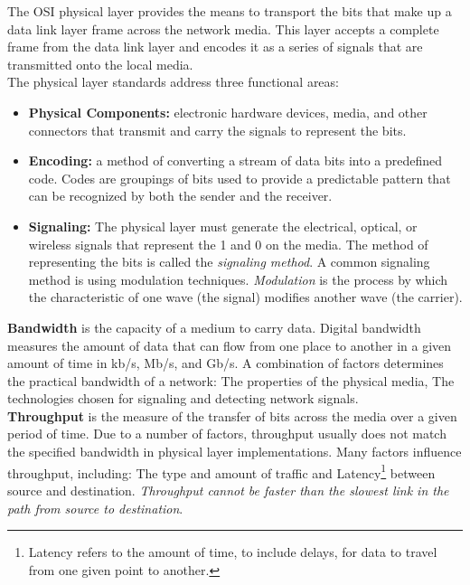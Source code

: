 The OSI physical layer provides the means to transport the bits that make up a data link layer frame across the network media. This layer accepts a complete frame from the data link layer and encodes it as a series of signals that are transmitted onto the local media.\\

The physical layer standards address three functional areas:

\begin{itemize}
\item \textbf{Physical Components:} electronic hardware devices, media, and other connectors that transmit and carry the signals to represent the bits.

\item \textbf{Encoding:} a method of converting a stream of data bits into a predefined code. Codes are groupings of bits used to provide a predictable pattern that can be recognized by both the sender and the receiver. 

\item \textbf{Signaling:} The physical layer must generate the electrical, optical, or wireless signals that represent the 1 and 0 on the media. The method of representing the bits is called the \emph{signaling method}. A common signaling method  is using modulation techniques. \emph{Modulation} is the process by which the characteristic of one wave (the signal) modifies another wave (the carrier).
\end{itemize}

\textbf{Bandwidth} is the capacity of a medium to carry data. Digital bandwidth measures the amount of data that can flow from one place to another in a given amount of time in kb/s, Mb/s, and Gb/s. A combination of factors determines the practical bandwidth of a network: The properties of the physical media, The technologies chosen for signaling and detecting network signals.\\

\textbf{Throughput} is the measure of the transfer of bits across the media over a given period of time. Due to a number of factors, throughput usually does not match the specified bandwidth in physical layer implementations. Many factors influence throughput, including: The type and amount of traffic and Latency\footnote{Latency refers to the amount of time, to include delays, for data to travel from one given point to another.} between source and destination. \emph{Throughput cannot be faster than the slowest link in the path from source to destination}. \\

